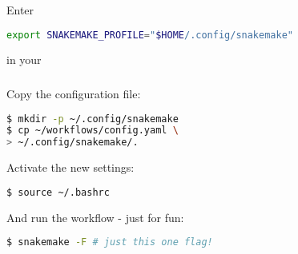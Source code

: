 \begin{frame}[fragile]
	\frametitle{}
	Enter 
	\begin{lstlisting}[language=Bash, style=Shell]
export SNAKEMAKE_PROFILE="$HOME/.config/snakemake"
    \end{lstlisting}
	in your 
\end{frame}

\begin{frame}[fragile]
	\frametitle{}
	Copy the configuration file:
	\begin{lstlisting}[language=Bash, style=Shell]
$ mkdir -p ~/.config/snakemake
$ cp ~/workflows/config.yaml \
> ~/.config/snakemake/.
	\end{lstlisting}
    Activate the new settings:
    \begin{lstlisting}[language=Bash, style=Shell]
$ source ~/.bashrc
    \end{lstlisting}
    And run the workflow - just for fun:
    \begin{lstlisting}[language=Bash, style=Shell]
$ snakemake -F # just this one flag!
    \end{lstlisting}
\end{frame}

	

